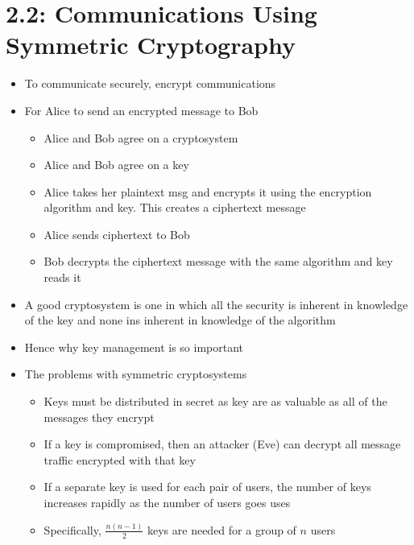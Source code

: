 \documentclass[]{article}
\begin{document}
\section{2.2: Communications Using Symmetric Cryptography}
\begin{itemize}
    \item To communicate securely, encrypt communications
    \item For Alice to send an encrypted message to Bob
    \begin{itemize}
        \item Alice and Bob agree on a cryptosystem
        \item Alice and Bob agree on a key
        \item Alice takes her plaintext msg and encrypts it using the encryption algorithm and key. This creates a ciphertext message
        \item Alice sends ciphertext to Bob
        \item Bob decrypts the ciphertext message with the same algorithm and key reads it
    \end{itemize}
    \item A good cryptosystem is one in which all the security is inherent in knowledge of the key and none ins inherent in knowledge of the algorithm
    \item Hence why key management is so important
    \item The problems with symmetric cryptosystems
    \begin{itemize}
        \item Keys must be distributed in secret as key are as valuable as all of the messages they encrypt
        \item If a key is compromised, then an attacker (Eve) can decrypt all message traffic encrypted with that key
        \item If a separate key is used for each pair of users, the number of keys increases rapidly as the number of users goes uses
        \item Specifically, $\frac{n(n-1)}{2}$ keys are needed for a group of $n$ users
    \end{itemize}
\end{itemize}
\end{document}
